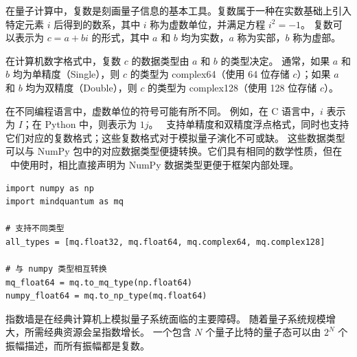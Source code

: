 

在量子计算中，复数是刻画量子信息的基本工具。复数属于一种在实数基础上引入特定元素 $i$ 后得到的数系，其中 $i$ 称为虚数单位，并满足方程 $i^2=-1$。
复数可以表示为 $c=a+bi$ 的形式，其中 $a$ 和 $b$ 均为实数，$a$ 称为实部，$b$ 称为虚部。

在计算机数字格式中，复数 $c$ 的数据类型由 $a$ 和 $b$ 的类型决定。
通常，如果 $a$ 和 $b$ 均为单精度（Single），则 $c$ 的类型为 complex64（使用 64 位存储 $c$）；如果 $a$ 和 $b$ 均为双精度（Double），则 $c$ 的类型为 complex128（使用 128 位存储 $c$）。

在不同编程语言中，虚数单位的符号可能有所不同。
例如，在 C 语言中，$i$ 表示为 $I$；在 Python 中，则表示为 $1j$。
\MindQuantum\ 支持单精度和双精度浮点格式，同时也支持它们对应的复数格式；这些复数格式对于模拟量子演化不可或缺。
这些数据类型可以与 NumPy \cite{harris2020array} 包中的对应数据类型便捷转换。它们具有相同的数学性质，但在 \MindQuantum\ 中使用时，相比直接声明为 NumPy 数据类型更便于框架内部处理。

\begin{lstlisting}
import numpy as np
import mindquantum as mq

# 支持不同类型
all_types = [mq.float32, mq.float64, mq.complex64, mq.complex128]

# 与 numpy 类型相互转换
mq_float64 = mq.to_mq_type(np.float64)
numpy_float64 = mq.to_np_type(mq.float64)
\end{lstlisting}

指数墙是在经典计算机上模拟量子系统面临的主要障碍。
随着量子系统规模增大，所需经典资源会呈指数增长。
一个包含 $N$ 个量子比特的量子态可以由 $2^N$ 个振幅描述，而所有振幅都是复数。

